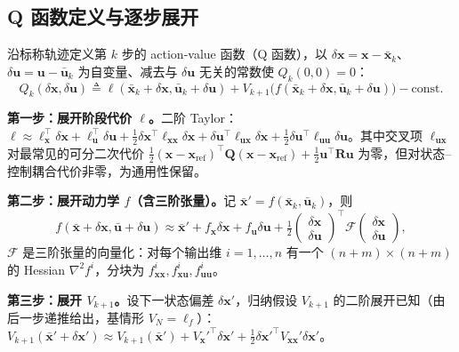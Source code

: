 \subsection{Q 函数定义与逐步展开}
\label{sec:ddp-Q-deriv}

沿标称轨迹定义第 $k$ 步的 action-value 函数（Q 函数），以 $\delta\mathbf{x}=\mathbf{x}-\bar{\mathbf{x}}_k$、$\delta\mathbf{u}=\mathbf{u}-\bar{\mathbf{u}}_k$ 为自变量、减去与 $\delta\mathbf{u}$ 无关的常数使 $Q_k(0,0)=0$：
\begin{equation}
  Q_k(\delta\mathbf{x},\delta\mathbf{u})\triangleq\ell(\bar{\mathbf{x}}_k+\delta\mathbf{x},\bar{\mathbf{u}}_k+\delta\mathbf{u})+V_{k+1}\big(f(\bar{\mathbf{x}}_k+\delta\mathbf{x},\bar{\mathbf{u}}_k+\delta\mathbf{u})\big)-\text{const}.
  \label{eq:ddp-Qdef}
\end{equation}

\textbf{第一步：展开阶段代价 $\ell$。}\;二阶 Taylor：$\ell\approx\ell_{\mathbf{x}}^\top\delta\mathbf{x}+\ell_{\mathbf{u}}^\top\delta\mathbf{u}+\tfrac12\delta\mathbf{x}^\top\ell_{\mathbf{xx}}\delta\mathbf{x}+\delta\mathbf{u}^\top\ell_{\mathbf{ux}}\delta\mathbf{x}+\tfrac12\delta\mathbf{u}^\top\ell_{\mathbf{uu}}\delta\mathbf{u}$。其中交叉项 $\ell_{\mathbf{ux}}$ 对最常见的可分二次代价 $\tfrac12(\mathbf{x}-\mathbf{x}_{\mathrm{ref}})^\top\mathbf{Q}(\mathbf{x}-\mathbf{x}_{\mathrm{ref}})+\tfrac12\mathbf{u}^\top\mathbf{R}\mathbf{u}$ 为零，但对状态--控制耦合代价非零，为通用性保留。

\textbf{第二步：展开动力学 $f$（含三阶张量）。}\;记 $\bar{\mathbf{x}}'=f(\bar{\mathbf{x}}_k,\bar{\mathbf{u}}_k)$，则
\begin{equation}
  f(\bar{\mathbf{x}}+\delta\mathbf{x},\bar{\mathbf{u}}+\delta\mathbf{u})\approx\bar{\mathbf{x}}'+f_{\mathbf{x}}\delta\mathbf{x}+f_{\mathbf{u}}\delta\mathbf{u}+\tfrac12\begin{pmatrix}\delta\mathbf{x}\\\delta\mathbf{u}\end{pmatrix}^\top\!\mathcal{F}\begin{pmatrix}\delta\mathbf{x}\\\delta\mathbf{u}\end{pmatrix},
  \label{eq:ddp-fexp}
\end{equation}
$\mathcal{F}$ 是三阶张量的向量化：对每个输出维 $i=1,\dots,n$ 有一个 $(n+m)\times(n+m)$ 的 Hessian $\nabla^2 f^i$，分块为 $f^i_{\mathbf{xx}},f^i_{\mathbf{xu}},f^i_{\mathbf{uu}}$。

\textbf{第三步：展开 $V_{k+1}$。}\;设下一状态偏差 $\delta\mathbf{x}'$，归纳假设 $V_{k+1}$ 的二阶展开已知（由后一步递推给出，基情形 $V_N=\ell_f$）：
$V_{k+1}(\bar{\mathbf{x}}'+\delta\mathbf{x}')\approx V_{k+1}(\bar{\mathbf{x}}')+V_{\mathbf{x}}'^{\top}\delta\mathbf{x}'+\tfrac12\delta\mathbf{x}'^{\top}V_{\mathbf{xx}}'\delta\mathbf{x}'$。

